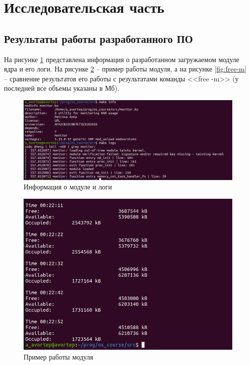\section{Исследовательская часть}

\subsection{Результаты работы разработанного ПО}

На рисунке \ref{fig:modinfo} представлена информация о разработанном загружаемом модуле ядра и его логи. На рисунке \ref{fig:example} -- пример работы модуля, а на рисунке \ref{fig:free-m} -- сравнение результатов его работы с результатами команды <<free -m>> (у последней все объемы указаны в Мб).

\begin{figure}[h!]
	\begin{center}
		\includegraphics[scale=0.38]{jpg/1.png}
	\end{center}
	\captionsetup{justification=centering}
	\caption{Информация о модуле и логи}
	\label{fig:modinfo}
\end{figure}

\begin{figure}[h!]
	\begin{center}
		\includegraphics[scale=0.4]{jpg/2.png}
	\end{center}
	\captionsetup{justification=centering}
	\caption{Пример работы модуля}
	\label{fig:example}
\end{figure}

